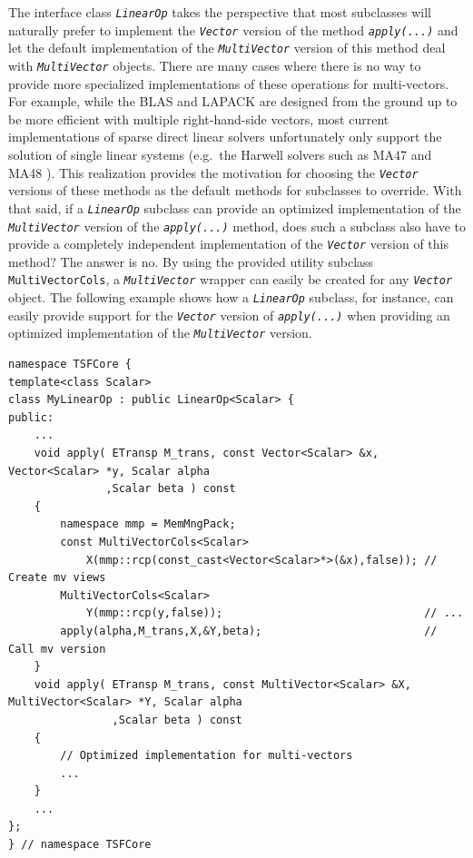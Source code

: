 The interface class \texttt{\textit{LinearOp}} takes the perspective
that most subclasses will naturally prefer to implement the
\texttt{\textit{Vector}} version of the method
\texttt{\textit{apply(\-...)}} and let the default implementation of the
\texttt{\textit{Multi\-Vector}} version of this method deal with
\texttt{\textit{Multi\-Vector}} objects.  There are many cases where there is no
way to provide more specialized implementations of these operations
for multi-vectors.  For example, while the BLAS and LAPACK are
designed from the ground up to be more efficient with multiple
right-hand-side vectors, most current implementations of sparse direct
linear solvers unfortunately only support the solution of single
linear systems (e.g.~the Harwell solvers such as MA47 and MA48
\cite{ref:hsl_1995}).  This realization provides the motivation for
choosing the \texttt{\textit{Vector}} versions of these methods as the
default methods for subclasses to override.  With that said, if a
\texttt{\textit{LinearOp}} subclass can
provide an optimized implementation of the \texttt{\textit{Multi\-Vector}}
version of the \texttt{\textit{apply(\-...)}} method, does such a subclass
also have to provide a completely independent implementation of the
\texttt{\textit{Vector}} version of this method?  The answer is no.
By using the provided utility subclass
\texttt{MultiVectorCols}, a \texttt{\textit{Multi\-Vector}} wrapper can
easily be created for any \texttt{\textit{Vector}} object.  The
following example shows how a
\texttt{\textit{LinearOp}} subclass, for instance, can easily provide
support for the \texttt{\textit{Vector}} version of
\texttt{\textit{apply(\-...)}} when providing an optimized
implementation of the \texttt{\textit{Multi\-Vector}} version.

{\scriptsize\begin{verbatim}
namespace TSFCore {
template<class Scalar>
class MyLinearOp : public LinearOp<Scalar> {
public:
    ...
    void apply( ETransp M_trans, const Vector<Scalar> &x, Vector<Scalar> *y, Scalar alpha
               ,Scalar beta ) const
    {
        namespace mmp = MemMngPack;
        const MultiVectorCols<Scalar>
            X(mmp::rcp(const_cast<Vector<Scalar>*>(&x),false)); // Create mv views
        MultiVectorCols<Scalar>
            Y(mmp::rcp(y,false));                               // ...
        apply(alpha,M_trans,X,&Y,beta);                         // Call mv version
    }
    void apply( ETransp M_trans, const MultiVector<Scalar> &X, MultiVector<Scalar> *Y, Scalar alpha
                ,Scalar beta ) const
    {
        // Optimized implementation for multi-vectors
        ...
    }
    ...
};
} // namespace TSFCore
\end{verbatim}}

